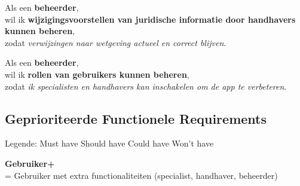 Als een \textbf{beheerder}, \\
wil ik \textbf{wijzigingsvoorstellen van juridische informatie door handhavers kunnen beheren}, \\
zodat \textit{verwijzingen naar wetgeving actueel en correct blijven}.

\vspace{1em}

Als een \textbf{beheerder}, \\
wil ik \textbf{rollen van gebruikers kunnen beheren}, \\
zodat \textit{ik specialisten en handhavers kan inschakelen om de app te verbeteren}.


\newpage

\subsection{Geprioriteerde Functionele Requirements}

\vspace{1em}

Legende: \enspace \textcolor{red}{\textbf{\bol}} Must have \enspace \textcolor{orange}{\textbf{\bol}} Should have \enspace \textcolor{ForestGreen}{\textbf{\bol}} Could have \enspace \textcolor{gray}{\textbf{\bol}} Won't have

\vspace{1em}

\textbf{Gebruiker+} \\ 
= Gebruiker met extra functionaliteiten (specialist, handhaver, beheerder)

\vspace{1em}

